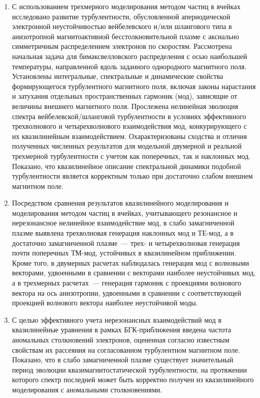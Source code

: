 \begin{enumerate}
    \item С использованием трехмерного моделирования методом частиц в ячейках исследовано развитие турбулентности, обусловленной апериодической электронной неустойчивостью вейбелевского и/или шлангового типа в анизотропной магнитоактивной бесстолкновительной плазме с аксиально симметричным распределением электронов по скоростям. Рассмотрена начальная задача для бимаксвелловского распределения с осью наибольшей температуры, направленной вдоль заданного однородного магнитного поля. 
    Установлены интегральные, спектральные и динамические свойства формирующегося турбулентного магнитного поля, включая законы нарастания и затухания отдельных пространственных гармоник (мод), зависящие от величины внешнего магнитного поля. 
    Прослежена нелинейная эволюция спектра вейбелевской/шланговой турбулентности в условиях эффективного трехволнового и четырехволнового взаимодействия мод, конкурирующего с их квазилинейным взаимодействием. Охарактеризованы сходства и отличия полученных численных результатов для модельной двумерной и реальной трехмерной турбулентности с учетом как поперечных, так и наклонных мод. Показано, что квазилинейное описание спектральной динамики подобной турбулентности является корректным только при достаточно слабом внешнем магнитном поле.

    \item Посредством сравнения результатов квазилинейного моделирования и моделирования методом частиц в ячейках, учитывающего резонансное и нерезонансное нелинейное взаимодействие мод, в слабо замагниченной плазме выявлена трехволновая генерация наклонных мод и ТЕ-мод, а в достаточно замагниченной плазме~--- трех- и четырехволновая генерация почти поперечных ТМ-мод, устойчивых в квазилинейном приближении. Кроме того, в двумерных расчетах наблюдалась генерация мод с волновыми векторами, удвоенными в сравнении с векторами наиболее неустойчивых мод, а в трехмерных расчетах~--- генерация гармоник с проекциями волнового вектора на ось анизотропии, удвоенными в сравнении с соответствующей проекцией волнового вектора наиболее неустойчивой моды. 

    \item С целью эффективного учета нерезонансных взаимодействий мод в квазилинейные уравнения в рамках БГК-приближения введена частота аномальных столкновений электронов, оцененная согласно известным свойствам их рассеяния на согласованном турбулентном магнитном поле. 
    Показано, что в слабо замагниченной плазме существует значительный период эволюции квазимагнитостатической турбулентности, на протяжении которого спектр последней может быть корректно получен из квазилинейного моделирования с аномальными столкновениями.


\end{enumerate}
